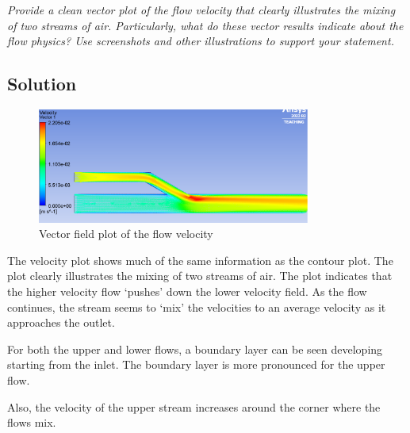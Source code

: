 \section{}
\textit{Provide a clean vector plot of the flow velocity that clearly illustrates the mixing of two
streams of air. Particularly, what do these vector results indicate about the flow physics?
Use screenshots and other illustrations to support your statement.}

\subsection*{Solution}
\begin{figure}[h]
    \centering
    \includegraphics[width=0.8\textwidth]{Questions/Figures/velocity vector.png}
    \caption{Vector field plot of the flow velocity}
    \label{fig:contour}
\end{figure}

The velocity plot shows much of the same information as the contour plot. The plot clearly illustrates the mixing of two streams of air. The plot indicates that the higher velocity flow `pushes' down the lower velocity field. As the flow continues, the stream seems to `mix' the velocities to an average velocity as it approaches the outlet.

For both the upper and lower flows, a boundary layer can be seen developing starting from the inlet. The boundary layer is more pronounced for the upper flow.

Also, the velocity of the upper stream increases around the corner where the flows mix.